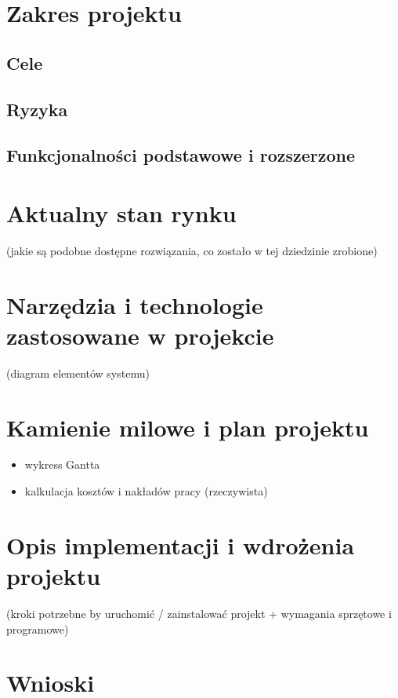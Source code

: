 \documentclass[12pt]{article}
\begin{document}
\section{Zakres projektu}
\subsection{Cele}
\subsection{Ryzyka}
\subsection{Funkcjonalności podstawowe i rozszerzone}


\newpage
\section{Aktualny stan rynku }
(jakie są podobne dostępne rozwiązania, co zostało w tej dziedzinie zrobione)
	




\newpage
\section{Narzędzia i technologie zastosowane w projekcie}
(diagram elementów systemu)


\newpage
\section{Kamienie milowe i plan projektu}
\begin{itemize}
\item wykress Gantta
\item kalkulacja kosztów i nakładów pracy (rzeczywista)
\end{itemize}


\newpage
\section{Opis implementacji i wdrożenia projektu}
(kroki potrzebne by uruchomić / zainstalować projekt + wymagania sprzętowe i programowe)


\newpage
\section{Wnioski}
\end{document}
